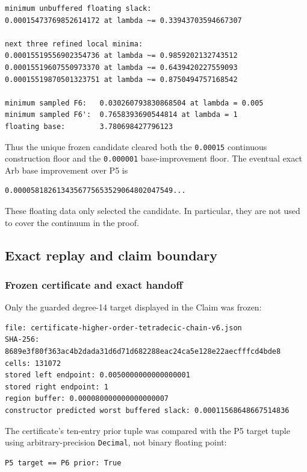 \begin{verbatim}
minimum unbuffered floating slack:
0.00015473769852614172 at lambda ~= 0.33943703594667307

next three refined local minima:
0.00015519556902354736 at lambda ~= 0.9859202132743512
0.00015519607550973370 at lambda ~= 0.6439420227559093
0.00015519870501323751 at lambda ~= 0.8750494757168542

minimum sampled F6:   0.030260793830868504 at lambda = 0.005
minimum sampled F6':  0.7658393690544814 at lambda = 1
floating base:        3.780698427796123
\end{verbatim}

Thus the unique frozen candidate cleared both the \texttt{0.00015}
continuous construction floor and the \texttt{0.000001} base-improvement
floor. The eventual exact Arb base improvement over P5 is

\begin{verbatim}
0.0000581826134356775653529064802047549...
\end{verbatim}

These floating data only selected the candidate. In particular, they are
not used to cover the continuum in the proof.

\subsection{Exact replay and claim boundary}

\subsubsection{Frozen certificate and exact handoff}

Only the guarded degree-14 target displayed in the Claim was frozen:

\begin{verbatim}
file: certificate-higher-order-tetradecic-chain-v6.json
SHA-256: 8689e3f80f363ac4b2dada31d6d71d682288eac24ca5e128e22aecfffcd4bde8
cells: 131072
stored left endpoint: 0.0050000000000000001
stored right endpoint: 1
region buffer: 0.000080000000000000007
constructor predicted worst buffered slack: 0.00011568648667514836
\end{verbatim}

The certificate's ten-entry prior tuple was compared with the P5 target
tuple using arbitrary-precision \texttt{Decimal}, not binary floating
point:

\begin{verbatim}
P5 target == P6 prior: True
\end{verbatim}

